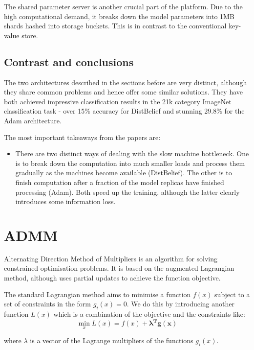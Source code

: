 \documentclass[a4paper, 11pt]{article}
\numberwithin{equation}{section}
\begin{document}
		The shared parameter server is another crucial part of the platform. Due to the high computational demand, it breaks down the model parameters into 1MB shards hashed into storage buckets. This is in contrast to the conventional key-value store.
		
		\subsection{Contrast and conclusions}
		
		The two architectures described in the sections before are very distinct, although they share common problems and hence offer some similar solutions. They have both achieved impressive classification results in the 21k category ImageNet classification task - over 15\% accuracy for DistBelief and stunning 29.8\% for the Adam architecture.
		
		The most important takeaways from the papers are:
		\begin{itemize}
		\item There are two distinct ways of dealing with the slow machine bottleneck. One is to break down the computation into much smaller loads and process them gradually as the machines become available (DistBelief). The other is to finish computation after a fraction of the model replicas have finished processing (Adam). Both speed up the training, although the latter clearly introduces some information loss.
		\end{itemize}
		
		\section{ADMM}
		\label{ADMM}
		
		Alternating Direction Method of Multipliers is an algorithm for solving constrained optimisation problems. It is based on the augmented Lagrangian method, although uses partial updates to achieve the function objective.
		
		The standard Lagrangian method aims to minimise a function $f(x)$ subject to a set of constraints in the form $g_i(x)=0$. We do this by introducing another function $L(x)$ which is a combination of the objective and the constraints like:
		\begin{equation}
		\min_{x} L(x) = f(x) + \boldsymbol{\lambda^T g(x)}
		\end{equation}
		
		where $\lambda$ is a vector of the Lagrange multipliers of the functions $g_i(x)$.\\
		
\end{document}
